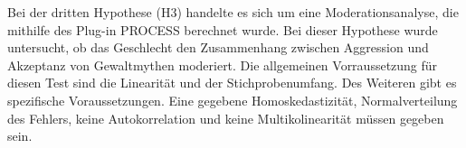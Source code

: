 Bei der dritten Hypothese (H3) handelte es sich um eine Moderationsanalyse, die mithilfe des Plug-in PROCESS\textsuperscript{\textregistered} berechnet wurde. Bei dieser Hypothese wurde untersucht, ob das Geschlecht den Zusammenhang zwischen Aggression und Akzeptanz von Gewaltmythen moderiert. Die allgemeinen Vorraussetzung für diesen Test sind die Linearität und der Stichprobenumfang. Des Weiteren gibt es spezifische Voraussetzungen. Eine gegebene Homoskedastizität, Normalverteilung des Fehlers, keine Autokorrelation und keine Multikolinearität müssen gegeben sein.